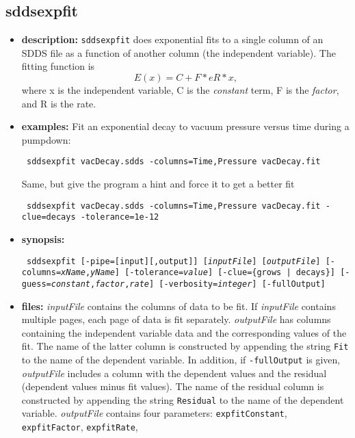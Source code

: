 \newpage
\subsection{sddsexpfit}
\label{sddsexpfit}

\begin{itemize}
\item {\bf description:}
{\tt sddsexpfit} does exponential fits to a single column of an SDDS file as a function of another column (the independent 
variable).  The fitting function is
\[ E(x) = C + F * e {R*x}, \]
where x is the independent variable, C is the {\em constant} term, F is the {\em factor}, and R is the {\rm rate}.
\item {\bf examples:} 
Fit an  exponential decay to vacuum pressure versus time during a pumpdown:
\begin{flushleft}{\tt
sddsexpfit vacDecay.sdds -columns=Time,Pressure vacDecay.fit
}\end{flushleft}
Same, but give the program a hint and force it to get a better fit
\begin{flushleft}{\tt
sddsexpfit vacDecay.sdds -columns=Time,Pressure vacDecay.fit -clue=decays -tolerance=1e-12
}\end{flushleft}
\item {\bf synopsis:} 
\begin{flushleft}{\tt
sddsexpfit [-pipe=[input][,output]] [{\em inputFile}] [{\em outputFile}]
[-columns={\em xName},{\em yName}] [-tolerance={\em value}] 
[-clue=\{grows | decays\}] [-guess={\em constant},{\em factor},{\em rate}] 
[-verbosity={\em integer}] [-fullOutput] 
}\end{flushleft}
\item {\bf files:}
{\em inputFile} contains the columns of data to be fit.  If {\em inputFile} contains multiple
pages, each page of data is fit separately.  {\em outputFile} has columns containing the
independent variable data and the corresponding values of the fit.  The name of the latter
column is constructed by appending the string {\tt Fit} to the name of the dependent variable.
In addition, if {\tt -fullOutput} is given, {\em outputFile} includes a column with the dependent values and
the residual (dependent values minus fit values).  The name of the residual column is
constructed by appending the string {\tt Residual} to the name of the dependent variable.  {\em
outputFile} contains four parameters: {\tt expfitConstant}, {\tt expfitFactor}, {\tt expfitRate},

\end{itemize}
